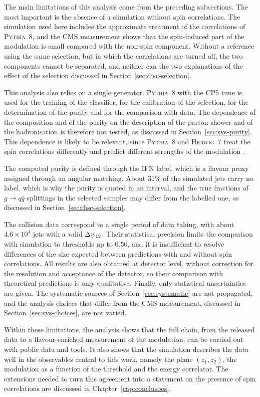 The main limitations of this analysis come from the preceding subsections. The 
most important is the absence of a simulation without spin correlations. The simulation
used here includes the approximate treatment of the correlations of
\textsc{Pythia}~8, and the CMS measurement shows that the spin-induced part of the
modulation is small compared with the non-spin component. Without a reference using 
the same selection, but in which
the correlations are turned off, the two components cannot be separated, and neither can the two
explanations of the effect of the selection discussed in
Section \ref{sec:disc-selection}.

This analysis also relies on a single generator. \textsc{Pythia}~8 with the CP5
tune is used for the training of the classifier, for the calibration of the
selection, for the determination of the purity and for the comparison with data.
The dependence of the composition and of the purity on the description of the
parton shower and of the hadronisation is therefore not tested, as discussed in
Section~\ref{sec:sys-purity}. This dependence is likely to be relevant, since
\textsc{Pythia}~8 and \textsc{Herwig}~7 treat the spin correlations differently
and predict different strengths of the modulation \cite{CMS:2026jnt}.

The computed purity is defined through the IFN label, which is a flavour proxy
assigned through an angular matching. About $31\%$ of the simulated jets carry no label,
which is why the purity is quoted in an interval, and the true fractions
of $g \to q\bar{q}$ splittings in the selected samples may differ from the labelled
one, as discussed in Section~\ref{sec:disc-selection}.

The collision data correspond to a single period of data taking, with about
$4.6 \times 10^{4}$ jets with a valid $\Delta\psi_{12}$. Their statistical precision limits
the comparison with simulation to thresholds up to $0.50$, and it is insufficient
to resolve differences of the size expected between predictions with and without
spin correlations. All results are also obtained at detector level, without
correction for the resolution and acceptance of the detector, so their comparison
with theoretical predictions is only qualitative. Finally, only statistical
uncertainties are given. The systematic sources of Section~\ref{sec:systematic}
are not propagated, and the analysis choices that differ from the CMS
measurement, discussed in Section~\ref{sec:sys-choices}, are not varied.

Within these limitations, the analysis shows that the full chain, from the
released data to a flavour-enriched measurement of the modulation, can be carried
out with public data and tools. It also shows that the simulation describes the
data well in the observables central to this work, namely the plane
$(z_1, z_2)$, the modulation as a function of the threshold and the energy
correlator. The extensions needed to turn this agreement into a statement on the
presence of spin correlations are discussed in Chapter~\ref{cap:conclusoes}.
